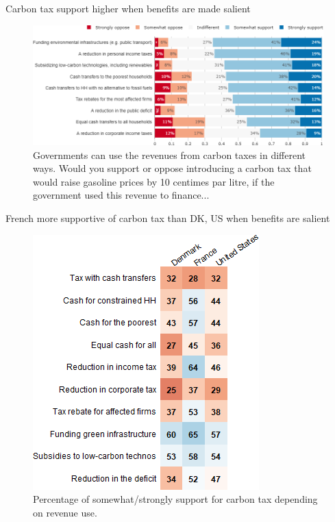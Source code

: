 \begin{framefont}{\small}
\begin{frame}{Carbon tax support higher when benefits are made salient}%
\begin{figure}[h!]
\centering
\caption{Governments can use the revenues from carbon taxes in different ways. Would you support or oppose introducing a carbon tax that would raise gasoline prices by 10 centimes par litre, if the government used this revenue to finance...}
\vspace{2mm}
\includegraphics[width=.87\paperwidth]{../figures/FR/tax_FR.png}
\end{figure}
\end{frame}



\begin{frame}{French more supportive of carbon tax than DK, US when benefits are salient}%
\begin{figure}[h!]
\centering

\caption{Percentage of somewhat/strongly support for carbon tax depending on revenue use.}
\includegraphics[height=.8\paperheight]{../figures/country_comparison/tax_all_positive_countries.png}
\end{figure}
\end{frame}


\end{framefont}
